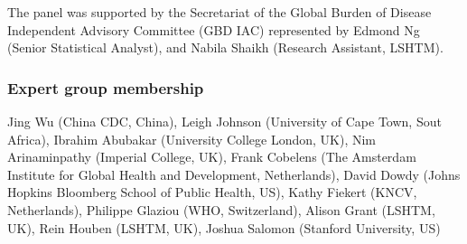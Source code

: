 \documentclass[12pt]{article}
\begin{document}
The panel was supported by the Secretariat of the Global Burden of Disease
Independent Advisory Committee (GBD IAC) represented by Edmond Ng (Senior
Statistical Analyst), and Nabila Shaikh (Research Assistant, LSHTM).


\subsubsection*{Expert group membership}

Jing Wu (China CDC, China), Leigh Johnson (University of Cape Town, Sout
Africa), Ibrahim Abubakar (University College London, UK), Nim Arinaminpathy (Imperial College,
UK), Frank Cobelens (The Amsterdam Institute for Global Health and Development, Netherlands),
David Dowdy (Johns Hopkins Bloomberg School of Public Health, US), Kathy Fiekert
(KNCV, Netherlands), Philippe Glaziou (WHO, Switzerland),
Alison Grant (LSHTM, UK), Rein Houben (LSHTM, UK), Joshua Salomon (Stanford University, US)
\end{document}
